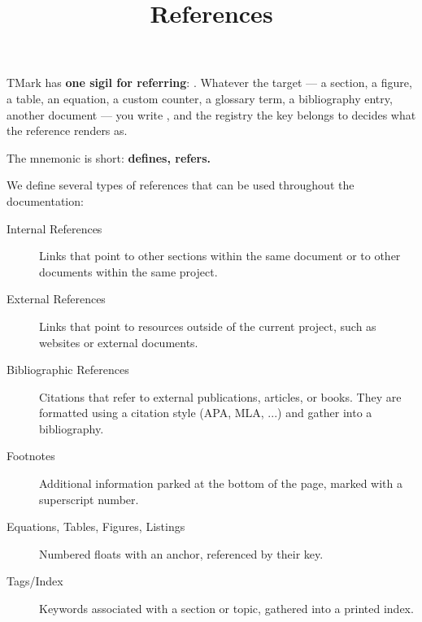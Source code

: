 \documentclass[a4paper,twoside]{article}
\title{References}
\author{}\date{}
\begin{document}
\maketitle
TMark has \textbf{one sigil for referring}: . Whatever the target --- a section, a
figure, a table, an equation, a custom counter, a glossary term, a bibliography
entry, another document --- you write , and the registry the key belongs to
decides what the reference renders as.

The mnemonic is short: \textbf{\tscodeinline{\#} defines,  refers.}

We define several types of references that can be used throughout the documentation:
\begin{description}
\item[{Internal References}] Links that point to other sections within the same document or to other documents within the same project.
\item[{External References}] Links that point to resources outside of the current project, such as websites or external documents.
\item[{Bibliographic References}] Citations that refer to external publications, articles, or books. They are formatted using a citation style (APA, MLA, ...) and gather into a bibliography.
\item[{Footnotes}] Additional information parked at the bottom of the page, marked with a superscript number.
\item[{Equations, Tables, Figures, Listings}] Numbered floats with an anchor, referenced by their key.
\item[{Tags/Index}] Keywords associated with a section or topic, gathered into a printed index.
\end{description}
\end{document}

